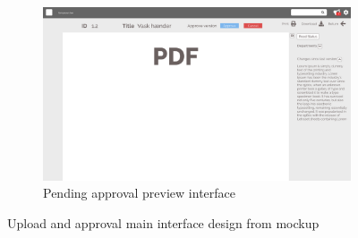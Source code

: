 \begin{figure}[H]\ContinuedFloat
	\centering
	\begin{subfigure}[b]{0.48\textwidth}
		\includegraphics[width=\textwidth]{billeder/iteration3Prototyper/Page_19.jpg}
		\caption{Pending approval preview interface}
		\label{fig:5-Approval2}
	\end{subfigure}
	\caption{Upload and approval main interface design from mockup}\label{fig:5-DocMockUp}
\end{figure}

